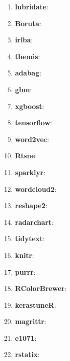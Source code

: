 \begin{enumerate}
    \item \textbf{lubridate}:
    \item \textbf{Boruta}:
    \item \textbf{irlba}:
    \item \textbf{themis}:
    \item \textbf{adabag}:
    \item \textbf{gbm}:
    \item \textbf{xgboost}:
    \item \textbf{tensorflow}:
    \item \textbf{word2vec}:
    \item \textbf{Rtsne}:
    \item \textbf{sparklyr}:
    \item \textbf{wordcloud2}:
    \item \textbf{reshape2}:
    \item \textbf{radarchart}:
    \item \textbf{tidytext}:
    \item \textbf{knitr}:
    \item \textbf{purrr}:
    \item \textbf{RColorBrewer}:
    \item \textbf{kerastuneR}:
    \item \textbf{magrittr}:
    \item \textbf{e1071}:
    \item \textbf{rstatix}:
\end{enumerate}

\newpage
